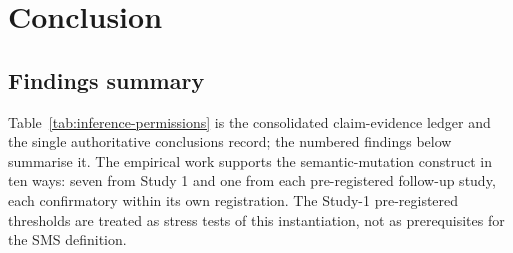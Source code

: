 \documentclass[manuscript,screen,review]{acmart}
\begin{document}


\section{Conclusion}\label{conclusion}

\subsection{Findings summary}\label{findings-summary}

Table~\ref{tab:inference-permissions} is the consolidated claim-evidence
ledger and the single authoritative conclusions record; the numbered findings
below summarise it. The empirical work supports the semantic-mutation
construct in ten ways: seven from Study 1 and one from each pre-registered
follow-up study, each confirmatory within its own registration. The
Study-1 pre-registered thresholds are treated as stress tests of this
instantiation, not as prerequisites for the SMS definition.
\end{document}

